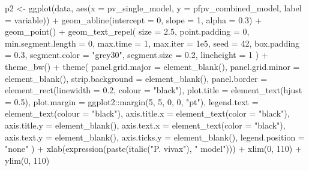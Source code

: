 \documentclass[
  11pt,
  oneside]{book}
\newenvironment{Shaded}{\begin{snugshade}}{\end{snugshade}}
\newcommand{\AttributeTok}[1]{\textcolor[rgb]{0.77,0.63,0.00}{#1}}
\newcommand{\DecValTok}[1]{\textcolor[rgb]{0.00,0.00,0.81}{#1}}
\newcommand{\FloatTok}[1]{\textcolor[rgb]{0.00,0.00,0.81}{#1}}
\newcommand{\FunctionTok}[1]{\textcolor[rgb]{0.00,0.00,0.00}{#1}}
\newcommand{\NormalTok}[1]{#1}
\newcommand{\OtherTok}[1]{\textcolor[rgb]{0.56,0.35,0.01}{#1}}
\newcommand{\SpecialCharTok}[1]{\textcolor[rgb]{0.00,0.00,0.00}{#1}}
\newcommand{\StringTok}[1]{\textcolor[rgb]{0.31,0.60,0.02}{#1}}
\begin{document}
\begin{Shaded}
\begin{Highlighting}[]
\NormalTok{p2 }\OtherTok{\textless{}{-}} \FunctionTok{ggplot}\NormalTok{(data, }\FunctionTok{aes}\NormalTok{(}\AttributeTok{x =}\NormalTok{ pv\_single\_model, }\AttributeTok{y =}\NormalTok{ pfpv\_combined\_model, }\AttributeTok{label =}\NormalTok{ variable)) }\SpecialCharTok{+}
  \FunctionTok{geom\_abline}\NormalTok{(}\AttributeTok{intercept =} \DecValTok{0}\NormalTok{, }\AttributeTok{slope =} \DecValTok{1}\NormalTok{, }\AttributeTok{alpha =} \FloatTok{0.3}\NormalTok{) }\SpecialCharTok{+}
  \FunctionTok{geom\_point}\NormalTok{() }\SpecialCharTok{+}
  \FunctionTok{geom\_text\_repel}\NormalTok{(}
    \AttributeTok{size =} \FloatTok{2.5}\NormalTok{, }\AttributeTok{point.padding =} \DecValTok{0}\NormalTok{, }\AttributeTok{min.segment.length =} \DecValTok{0}\NormalTok{,}
    \AttributeTok{max.time =} \DecValTok{1}\NormalTok{, }\AttributeTok{max.iter =} \FloatTok{1e5}\NormalTok{, }\AttributeTok{seed =} \DecValTok{42}\NormalTok{, }\AttributeTok{box.padding =} \FloatTok{0.3}\NormalTok{,}
    \AttributeTok{segment.color =} \StringTok{"grey30"}\NormalTok{, }\AttributeTok{segment.size =} \FloatTok{0.2}\NormalTok{, }\AttributeTok{lineheight =} \DecValTok{1}
\NormalTok{  ) }\SpecialCharTok{+}
  \FunctionTok{theme\_bw}\NormalTok{() }\SpecialCharTok{+}
  \FunctionTok{theme}\NormalTok{(}
    \AttributeTok{panel.grid.major =} \FunctionTok{element\_blank}\NormalTok{(),}
    \AttributeTok{panel.grid.minor =} \FunctionTok{element\_blank}\NormalTok{(),}
    \AttributeTok{strip.background =} \FunctionTok{element\_blank}\NormalTok{(),}
    \AttributeTok{panel.border =} \FunctionTok{element\_rect}\NormalTok{(}\AttributeTok{linewidth =} \FloatTok{0.2}\NormalTok{, }\AttributeTok{colour =} \StringTok{"black"}\NormalTok{),}
    \AttributeTok{plot.title =} \FunctionTok{element\_text}\NormalTok{(}\AttributeTok{hjust =} \FloatTok{0.5}\NormalTok{),}
    \AttributeTok{plot.margin =}\NormalTok{ ggplot2}\SpecialCharTok{::}\FunctionTok{margin}\NormalTok{(}\DecValTok{5}\NormalTok{, }\DecValTok{5}\NormalTok{, }\DecValTok{0}\NormalTok{, }\DecValTok{0}\NormalTok{, }\StringTok{"pt"}\NormalTok{),}
    \AttributeTok{legend.text =} \FunctionTok{element\_text}\NormalTok{(}\AttributeTok{colour =} \StringTok{"black"}\NormalTok{),}
    \AttributeTok{axis.title.x =} \FunctionTok{element\_text}\NormalTok{(}\AttributeTok{color =} \StringTok{"black"}\NormalTok{),}
    \AttributeTok{axis.title.y =} \FunctionTok{element\_blank}\NormalTok{(),}
    \AttributeTok{axis.text.x =} \FunctionTok{element\_text}\NormalTok{(}\AttributeTok{color =} \StringTok{"black"}\NormalTok{),}
    \AttributeTok{axis.text.y =} \FunctionTok{element\_blank}\NormalTok{(),}
    \AttributeTok{axis.ticks.y =} \FunctionTok{element\_blank}\NormalTok{(),}
    \AttributeTok{legend.position =} \StringTok{"none"}
\NormalTok{  ) }\SpecialCharTok{+}
  \FunctionTok{xlab}\NormalTok{(}\FunctionTok{expression}\NormalTok{(}\FunctionTok{paste}\NormalTok{(}\FunctionTok{italic}\NormalTok{(}\StringTok{"P. vivax"}\NormalTok{), }\StringTok{" model"}\NormalTok{))) }\SpecialCharTok{+}
  \FunctionTok{xlim}\NormalTok{(}\DecValTok{0}\NormalTok{, }\DecValTok{110}\NormalTok{) }\SpecialCharTok{+}
  \FunctionTok{ylim}\NormalTok{(}\DecValTok{0}\NormalTok{, }\DecValTok{110}\NormalTok{)}


\end{Highlighting}
\end{Shaded}
\end{document}
